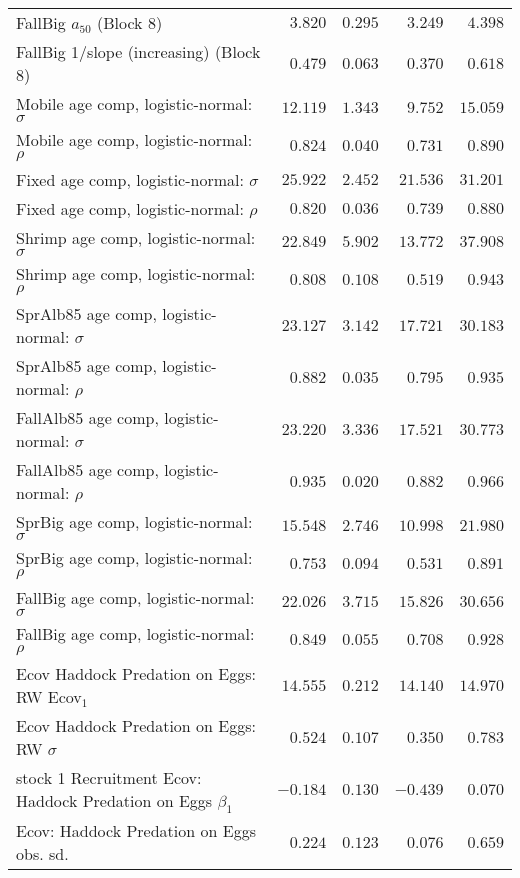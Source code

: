 \documentclass[
]{article}
\begin{document}
\begin{landscape}
\begin{longtable}[t]{lrrrr}
\addlinespace
FallBig $a_{50}$ (Block 8) & $3.820$ & $0.295$ & $3.249$ & $4.398$\\
FallBig 1/slope (increasing) (Block 8) & $0.479$ & $0.063$ & $0.370$ & $0.618$\\
Mobile age comp, logistic-normal: $\sigma$ & $12.119$ & $1.343$ & $9.752$ & $15.059$\\
Mobile age comp, logistic-normal: $\rho$ & $0.824$ & $0.040$ & $0.731$ & $0.890$\\
Fixed age comp, logistic-normal: $\sigma$ & $25.922$ & $2.452$ & $21.536$ & $31.201$\\
\addlinespace
Fixed age comp, logistic-normal: $\rho$ & $0.820$ & $0.036$ & $0.739$ & $0.880$\\
Shrimp age comp, logistic-normal: $\sigma$ & $22.849$ & $5.902$ & $13.772$ & $37.908$\\
Shrimp age comp, logistic-normal: $\rho$ & $0.808$ & $0.108$ & $0.519$ & $0.943$\\
SprAlb85 age comp, logistic-normal: $\sigma$ & $23.127$ & $3.142$ & $17.721$ & $30.183$\\
SprAlb85 age comp, logistic-normal: $\rho$ & $0.882$ & $0.035$ & $0.795$ & $0.935$\\
\addlinespace
FallAlb85 age comp, logistic-normal: $\sigma$ & $23.220$ & $3.336$ & $17.521$ & $30.773$\\
FallAlb85 age comp, logistic-normal: $\rho$ & $0.935$ & $0.020$ & $0.882$ & $0.966$\\
SprBig age comp, logistic-normal: $\sigma$ & $15.548$ & $2.746$ & $10.998$ & $21.980$\\
SprBig age comp, logistic-normal: $\rho$ & $0.753$ & $0.094$ & $0.531$ & $0.891$\\
FallBig age comp, logistic-normal: $\sigma$ & $22.026$ & $3.715$ & $15.826$ & $30.656$\\
\addlinespace
FallBig age comp, logistic-normal: $\rho$ & $0.849$ & $0.055$ & $0.708$ & $0.928$\\
Ecov Haddock Predation on Eggs: RW Ecov$_1$ & $14.555$ & $0.212$ & $14.140$ & $14.970$\\
Ecov Haddock Predation on Eggs: RW $\sigma$ & $0.524$ & $0.107$ & $0.350$ & $0.783$\\
stock 1 Recruitment Ecov: Haddock Predation on Eggs $\beta_1$ & $-0.184$ & $0.130$ & $-0.439$ & $0.070$\\
Ecov: Haddock Predation on Eggs obs. sd. & $0.224$ & $0.123$ & $0.076$ & $0.659$\\*
\end{longtable}
\end{landscape}
\end{document}
